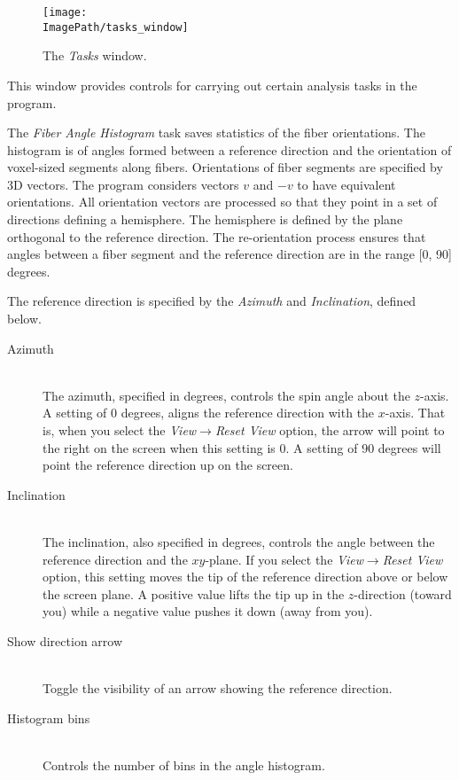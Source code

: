 \documentclass[11pt,titlepage,twoside]{article}
\begin{document}
\begin{figure}[htbp] %
   \centering
   \texttt{[image: \\ImagePath/tasks\_window]} 
   \caption{The \emph{Tasks} window.}
   \label{fig:TasksWindow}
\end{figure}

This window provides controls for carrying out certain analysis tasks in the program.

The \emph{Fiber Angle Histogram} task saves statistics of the fiber orientations. The histogram
is of angles formed between a reference direction and the orientation of voxel-sized segments along fibers. Orientations of fiber segments are specified by 3D vectors. The program considers vectors $v$ and $-v$ to have equivalent orientations. All orientation vectors are processed so that they point in a set of directions defining a hemisphere. The hemisphere is defined by the plane orthogonal to the reference direction. The re-orientation process ensures that angles between a fiber segment and the reference direction are in the range [0, 90] degrees.

The reference direction is specified by the \emph{Azimuth} and \emph{Inclination}, defined below.

\begin{description}

\item[Azimuth] \hfill \\
The azimuth, specified in degrees, controls the spin angle about the $z$-axis. A setting of 0 degrees, aligns the reference direction with the $x$-axis. That is, when you select the \emph{View}$\rightarrow$\emph{Reset View} option, the arrow will point to the right on the screen when this
setting is 0. A setting of 90 degrees will point the reference direction up on the screen.

\item[Inclination] \hfill \\
The inclination, also specified in degrees, controls the angle between the reference direction and the $xy$-plane. If you select the \emph{View}$\rightarrow$\emph{Reset View} option, this setting moves the tip of the reference direction above or below the screen plane. A positive value lifts the tip up in the $z$-direction (toward you) while a negative value pushes it down (away from you).

\item[Show direction arrow] \hfill \\
Toggle the visibility of an arrow showing the reference direction.

\item[Histogram bins] \hfill \\
Controls the number of bins in the angle histogram.

\end{description}
\end{document}
